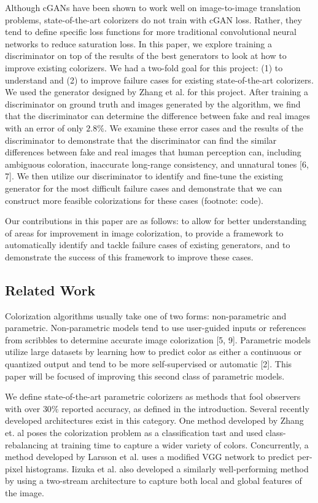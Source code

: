 \documentclass[10pt,twocolumn,letterpaper]{article}
\begin{document}
Although cGANs have been shown to work well on image-to-image translation problems, state-of-the-art colorizers do not train with cGAN loss. Rather, they tend to define specific loss functions for more traditional convolutional neural networks to reduce saturation loss. In this paper, we explore training a discriminator on top of the results of the best generators to look at how to improve existing colorizers. We had a two-fold goal for this project: (1) to understand and (2) to improve failure cases for existing state-of-the-art colorizers. We used the generator designed by Zhang et al. for this project. After training a discriminator on ground truth and images generated by the algorithm, we find that the discriminator can determine the difference between fake and real images with an error of only $2.8\%$. We examine these error cases and the results of the discriminator to demonstrate that the discriminator can find the similar differences between fake and real images that human perception can, including ambiguous coloration, inaccurate long-range consistency, and unnatural tones [6, 7]. We then utilize our discriminator to identify and fine-tune the existing generator for the most difficult failure cases and demonstrate that we can construct more feasible colorizations for these cases (footnote: code).

Our contributions in this paper are as follows: to allow for better understanding of areas for improvement in image colorization, to provide a framework to automatically identify and tackle failure cases of existing generators, and to demonstrate the success of this framework to improve these cases. 

\subsection{Related Work}

Colorization algorithms usually take one of two forms: non-parametric and parametric. Non-parametric models tend to use user-guided inputs or references from scribbles to determine accurate image colorization [5, 9]. Parametric models utilize large datasets by learning how to predict color as either a continuous or quantized output and tend to be more self-supervised or automatic [2]. This paper will be focused of improving this second class of parametric models.

We define state-of-the-art parametric colorizers as methods that fool observers with over $30\%$ reported accuracy, as defined in the introduction. Several recently developed architectures exist in this category. One method developed by Zhang et. al poses the colorization problem as a classification tast and used class-rebalancing at training time to capture a wider variety of colors. Concurrently, a method developed by Larsson et al. uses a modified VGG network to predict per-pixel histograms. Iizuka et al. also developed a similarly well-performing method by using a two-stream architecture to capture both local and global features of the image.
\end{document}
